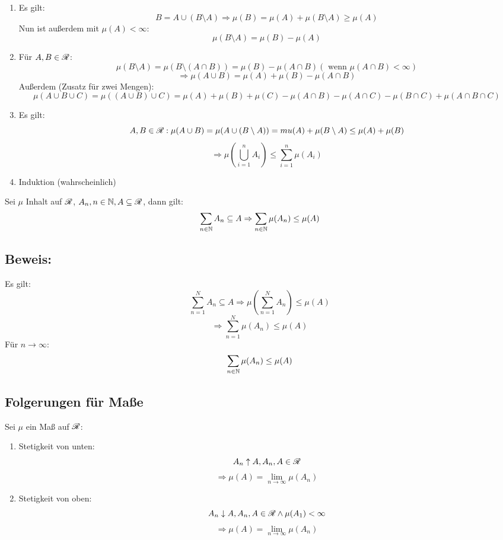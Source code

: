 		\begin{bew}
			\begin{enumerate}
				\item Es gilt:
				\[ B=A\cup (B\setminus A)\Rightarrow \mu(B)=\mu(A)+\mu(B\setminus A)\ge \mu(A) \]
				Nun ist außerdem mit $\mu(A)<\infty$:
				\[ \mu(B\setminus A)=\mu(B)-\mu(A) \]
				\item
				Für $A,B\in\mathscr{R}$:
				\[ \mu(B\setminus A)=\mu(B\setminus (A\cap B))=\mu(B)-\mu(A\cap B) (\text{ wenn }\mu(A\cap B)<\infty) \]
				\[ \Rightarrow \mu(A\cup B)=\mu(A)+\mu(B)-\mu(A\cap B) \]
				Außerdem (Zusatz für zwei Mengen):
				\[ \mu(A\cup B\cup C)=\mu((A\cup B)\cup C)=\mu(A)+\mu(B)+\mu(C)-\mu(A\cap B)-\mu(A\cap C)-\mu(B\cap C)+\mu(A\cap B\cap C) \]
				\item Es gilt:
				\[ A,B\in\mathscr{R}: \mu(A\cup B)=\mu(A\cup (B\setminus A))=mu(A)+\mu(B\setminus A)\le \mu(A)+\mu(B) \]
				\[ \Rightarrow \mu\left(\bigcup_{i=1}^n A_i\right)\le \sum_{i=1}^n \mu(A_i) \]
				\item Induktion (wahrscheinlich)
			\end{enumerate}
		\end{bew}
		\begin{satz}
			Sei $\mu$ Inhalt auf $\mathscr{R}$, $A_n, n\in\mathbb{N}, A\subseteq\mathscr{R}$, dann gilt:
			\[ \sum_{n\in\mathbb{N}} A_n\subseteq A\Rightarrow \sum_{n\in\mathbb{N}}\mu(A_n)\le \mu(A) \]
		\subsection{Beweis:}
			Es gilt:
			\[ \sum_{n=1}^N A_n\subseteq A\Rightarrow \mu\left(\sum_{n=1}^N A_n\right) \le \mu(A) \]
			\[ \Rightarrow \sum_{n=1}^N \mu(A_n)\le \mu(A) \]
			Für $n\to\infty$:
			\[ \sum_{n\in\mathbb{N}} \mu(A_n)\le \mu(A) \]
		\end{satz}
		
		\subsection{Folgerungen für Maße}
		
		\begin{satz}
			Sei $\mu$ ein Maß auf $\mathscr{R}$:
			\begin{enumerate}
				\item Stetigkeit von unten:
				\[ A_n\uparrow A, A_n, A\in\mathscr{R} \]
				\[ \Rightarrow \mu(A)=\lim_{n\to\infty} \mu(A_n) \]
				\item Stetigkeit von oben:
				\[ A_n\downarrow A, A_n, A\in\mathscr{R}\land \mu(A_1)<\infty \]
				\[ \Rightarrow \mu(A)=\lim_{n\to\infty} \mu(A_n) \]
			\end{enumerate}
		\end{satz}
			
